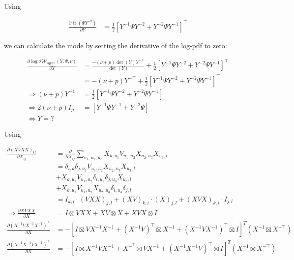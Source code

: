 Using 

\begin{align}
	\frac{\partial \operatorname{tr}(\Psi Y^{-2})}{\partial Y} &= \frac{1}{2}[Y^{-1}\Psi Y^{-2} + Y^{-2}\Psi Y^{-1}]^\top 
\end{align}

we can calculate the mode by setting the derivative of the log-pdf to zero:

\begin{subequations}
\begin{align}
	\frac{\partial \log \mathcal{IW}_{\text{sqrtm}}(Y, \Psi, \nu)}{\partial Y} &= \frac{-(\nu + p )\det(Y) Y^{-\top}}{\det(Y)} + \frac{1}{2}[Y^{-1}\Psi Y^{-2} + Y^{-2}\Psi Y^{-1}]^\top \\
	&= -(\nu + p)Y^{-\top} + \frac{1}{2}[Y^{-1}\Psi Y^{-2} + Y^{-2}\Psi Y^{-1}]^\top \\
	\Rightarrow (\nu + p)Y^{-1} &= \frac{1}{2}[Y^{-1}\Psi Y^{-2} + Y^{-2}\Psi Y^{-1}] \\
	\Rightarrow 2(\nu + p)I_p &= [Y^{-1}\Psi Y^{-1} + Y^{-2}\Psi] \\
	\Leftrightarrow Y = ?
\end{align}
\end{subequations}

Using

\begin{align}
	\frac{\partial(XVXX)_{kl}}{\partial X_{ij}} &= \frac{\partial}{\partial X_{ij}} \sum_{u_1, u_2, u_3} X_{k,u_1} V_{u_1, u_2} X_{u_2, u_3} X_{u_3, l} \\
	&= \delta_{i,k} \delta_{j,u_1} V_{u_1, u_2} X_{u_2, u_3} X_{u_3, l} \\
	&+ X_{k,u_1} V_{u_1, u_2} \delta_{i,u_2} \delta_{j,u_3}X_{u_3, l} \\
	&+ X_{k,u_1} V_{u_1, u_2} X_{u_2, u_3}\delta_{i,u_3} \delta_{j,l} \\
	&= I_{k,i} \cdot (VXX)_{j,l} + (XV)_{k,i} \cdot (X)_{j,l} + (XVX)_{k,i} \cdot I_{j,l} \\
	\Rightarrow \frac{\partial XVXX}{\partial X} &=  I \otimes VXX + XV \otimes X + XVX \otimes I \\
	\frac{\partial (X^{-1} V X^{-1} X^{-1})^\top}{\partial X} &= -[I \boxtimes VX^{-1}X^{-1} + (X^{-1}V)^\top \boxtimes X^{-1} + (X^{-1}VX^{-1})^\top \boxtimes I]^T (X^{-1} \boxtimes X^{-\top}) \\
	\frac{\partial (X^{-1} X^{-1} V X^{-1})^\top}{\partial X} &= -[I \boxtimes X^{-1}VX^{-1} + X^{-^\top} \boxtimes VX^{-1} + (X^{-1}X^{-1}V)^\top \boxtimes I]^T (X^{-1} \boxtimes X^{-\top})
\end{align}

